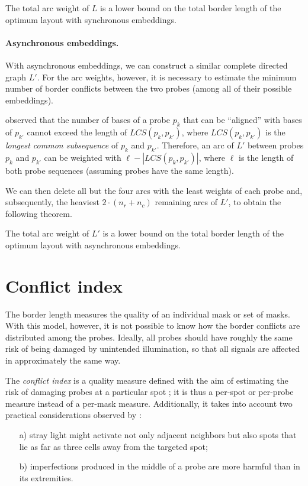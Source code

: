 \begin{theorem}
  \label{thm:sync_lb}
  The total arc weight of $L$ is a lower bound on the total border length of
  the optimum layout with synchronous embeddings.
\end{theorem}

\paragraph{Asynchronous embeddings.}
With asynchronous embeddings, we can construct a similar complete directed graph
$L'$. For the arc weights, however, it is necessary to estimate the minimum
number of border conflicts between the two probes (among all of their possible
embeddings).

\citet{Kahng2002} observed that the number of bases of a probe $p_k$ that can
be ``aligned'' with bases of $p_{k'}$ cannot exceed the length of $LCS(p_k,p_{k'})$,
where $LCS(p_k,p_{k'})$ is the
\emph{longest common subsequence} of $p_k$ and $p_{k'}$. Therefore, an arc of $L'$
between probes $p_k$ and $p_{k'}$ can be weighted with $\ell - |LCS(p_k,p_{k'})|$,
where $\ell$ is the length of both probe sequences (assuming probes have the same length).

We can then delete all but the four arcs with the least weights of each probe
and, subsequently, the heaviest $2 \cdot (n_r + n_c)$ remaining arcs of $L'$, to
obtain the following theorem.

\begin{theorem}
  \label{thm:async_lb}
  The total arc weight of $L'$ is a lower bound on the total border length of
  the optimum layout with asynchronous embeddings.
\end{theorem}

\section{Conflict index}
\label{sec:mlp_conflict_index}

The border length measures the quality of an individual mask or set of masks.
With this model, however, it is not possible to know how the border conflicts
are distributed among the probes. Ideally, all probes should have roughly the
same risk of being damaged by unintended illumination, so that all signals are
affected in approximately the same way.

The \emph{conflict index} is a quality measure defined with the aim of
estimating the risk of damaging probes at a particular spot
\citep{Carvalho2006a}; it is thus a per-spot or per-probe measure instead of a
per-mask measure. Additionally, it takes into account two practical
considerations observed by \citet{Kahng2003}:
\begin{itemize}
\item[a)] stray light might activate not only adjacent neighbors but also spots
  that lie as far as three cells away from the targeted spot;
\item[b)] imperfections produced in the middle of a probe are more harmful than
  in its extremities.
\end{itemize}

